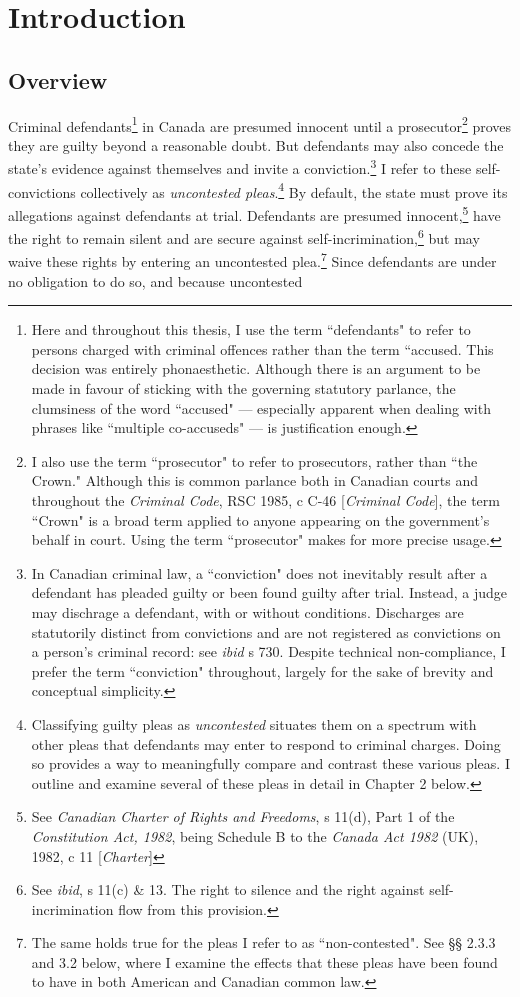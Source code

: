\chapter{Introduction}

\section{Overview}

Criminal defendants\footnote{Here and throughout this thesis, I use the term ``defendants" to refer to persons charged with criminal offences rather than the term ``accused. This decision was entirely phonaesthetic. Although there is an argument to be made in favour of sticking with the governing statutory parlance, the clumsiness of the word ``accused" — especially apparent when dealing with phrases like ``multiple co-accuseds" — is justification enough.} in Canada are presumed innocent until a prosecutor\footnote{I also use the term ``prosecutor" to refer to prosecutors, rather than ``the Crown." Although this is common parlance both in Canadian courts and throughout the \textit{Criminal Code}, RSC 1985, c C-46 [\textit{Criminal Code}], the term ``Crown" is a broad term applied to anyone appearing on the government's behalf in court. Using the term ``prosecutor" makes for more precise usage.} proves they are guilty beyond a reasonable doubt. But defendants may also concede the state's evidence against themselves and invite a conviction.\footnote{In Canadian criminal law, a ``conviction" does not inevitably result after a defendant has pleaded guilty or been found guilty after trial. Instead, a judge may dischrage a defendant, with or without conditions. Discharges are statutorily distinct from convictions and are not registered as convictions on a person's criminal record: see \textit{ibid} s 730. Despite technical non-compliance, I prefer the term ``conviction" throughout, largely for the sake of brevity and conceptual simplicity.} I refer to these self-convictions collectively as \textit{uncontested pleas}.\footnote{Classifying guilty pleas as \textit{uncontested} situates them on a spectrum with other pleas that defendants may enter to respond to criminal charges. Doing so provides a way to meaningfully compare and contrast these various pleas. I outline and examine several of these pleas in detail in Chapter 2 below.} By default, the state must prove its allegations against defendants at trial. Defendants are presumed innocent,\footnote{See \textit{Canadian Charter of Rights and Freedoms}, s 11(d), Part 1 of the \textit{Constitution Act, 1982}, being Schedule B to the \textit{Canada Act 1982} (UK), 1982, c 11 [\textit{Charter}]} have the right to remain silent and are secure against self-incrimination,\footnote{See \textit{ibid}, s 11(c) \& 13. The right to silence and the right against self-incrimination flow from this provision.} but may waive these rights by entering an uncontested plea.\footnote{The same holds true for the pleas I refer to as ``non-contested". See §§ 2.3.3 and 3.2 below, where I examine the effects that these pleas have been found to have in both American and Canadian common law.} Since defendants are under no obligation to do so, and because uncontested 